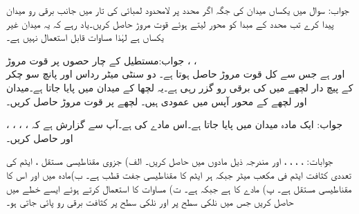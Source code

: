 جواب:
سوال  میں یکساں میدان کی جگہ اگر  محدد پر لامحدود لمبائی کی تار میں  جانب  برقی رو میدان پیدا کرے تب محدد کے مبدا  کو محور لیتے ہوئے قوت مروڑ حاصل کریں۔یاد رہے کہ یہ میدان غیر یکساں ہے لہٰذا مساوات   قابل استعمال نہیں ہے۔

جواب:مستطیل کے چار حصوں پر قوت مروڑ ، ، \\
 اور   ہے جس سے کل قوت مروڑ   حاصل ہوتا ہے۔
دو سنٹی میٹر رداس اور پانچ سو چکر کے پیچ دار لچھے میں  کی برقی رو گزر رہی ہے۔یہ لچھا  کے میدان میں پایا جاتا ہے۔میدان اور لچھے کے محور آپس میں عمودی ہیں۔ لچھے پر قوت مروڑ حاصل کریں۔

جواب:
ایک مادہ  میدان  میں پایا جاتا ہے۔اس مادے کی  ہے۔آپ سے گزارش ہے کہ ، ، ،  ، اور  حاصل کریں۔

جوابات: ، ، ، ،  اور 
مندرجہ ذیل مادوں میں  حاصل کریں۔ الف) جزوی مقناطیسی مستقل ، ایٹم کی تعددی کثافت  ایٹم فی مکعب میٹر جبکہ ہر ایٹم کا مقناطیسی جفت قطب  ہے۔ ب)مادہ میں  اور  اس کا مقناطیسی مستقل  ہے۔ پ) مادے کا  ہے جبکہ  ہے۔ ت) مساوات  کا استعمال کرتے ہوئے  ایسے خطے میں  حاصل کریں جس میں نلکی سطح  پر  اور نلکی سطح  پر  کثافت برقی رو پائی جاتی ہو۔

